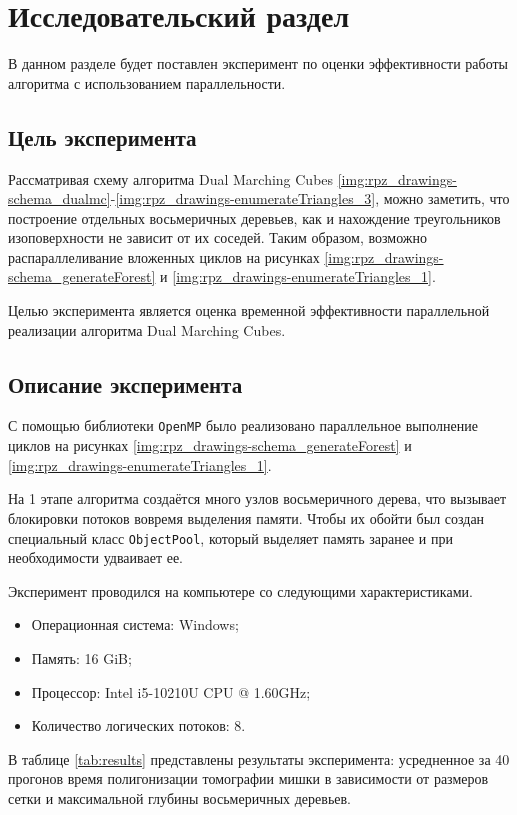 \chapter{Исследовательский раздел}

В данном разделе будет поставлен эксперимент по оценки эффективности работы алгоритма с использованием параллельности.

\section{Цель эксперимента}
 
Рассматривая схему алгоритма Dual Marching Cubes \ref{img:rpz_drawings-schema_dualmc}-\ref{img:rpz_drawings-enumerateTriangles_3}, можно заметить, что построение отдельных восьмеричных деревьев, как и нахождение треугольников изоповерхности не зависит от их соседей. Таким образом, возможно распараллеливание вложенных циклов на рисунках \ref{img:rpz_drawings-schema_generateForest} и \ref{img:rpz_drawings-enumerateTriangles_1}.

Целью эксперимента является оценка временной эффективности параллельной реализации алгоритма Dual Marching Cubes.

\section{Описание эксперимента}

С помощью библиотеки \texttt{OpenMP}\cite{openmp} было реализовано параллельное выполнение циклов на рисунках \ref{img:rpz_drawings-schema_generateForest} и \ref{img:rpz_drawings-enumerateTriangles_1}.

На 1 этапе алгоритма создаётся много узлов восьмеричного дерева, что вызывает блокировки потоков вовремя выделения памяти. Чтобы их обойти был создан специальный класс \texttt{ObjectPool}, который выделяет память заранее и при необходимости удваивает ее.

Эксперимент проводился на компьютере со следующими характеристиками.
\begin{itemize}
	\item Операционная система: Windows;
	\item Память: 16 GiB;
	\item Процессор: Intel i5-10210U CPU @ 1.60GHz;
	\item Количество логических потоков: 8.
\end{itemize}

В таблице \ref{tab:results} представлены результаты эксперимента: усредненное за 40 прогонов время полигонизации томографии мишки в зависимости от размеров сетки и максимальной глубины восьмеричных деревьев. 

